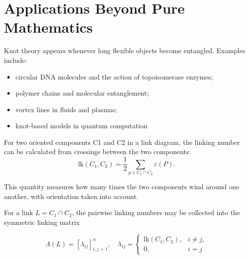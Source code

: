 \section{Applications Beyond Pure Mathematics}

Knot theory appears whenever long flexible objects become entangled. Examples include:

\begin{itemize}[label=$\bigoplus$]
    \item circular DNA molecules and the action of topoisomerase enzymes;
    \item polymer chains and molecular entanglement;
    \item vortex lines in fluids and plasmas;
    \item knot-based models in quantum computation
\end{itemize}

For two oriented components C1 and C2 in a link diagram, the linking number can be calculated from crossings between the two components:
\begin{equation}
    \text{lk}(C_1, C_2) = \frac{1}{2} \sum_{p\in C_1 \cap C_2} \varepsilon(P).
\end{equation}

This quantity measures how many times the two components wind around one another, with orientation taken
into account.

For a link $L= C_1 \cap C_2$, the pairwise linking numbers may be collected into the symmetric linking matrix

\begin{equation}
    \Lambda (L) = [\lambda_{ij}]_{i,j=1}^n , \quad \lambda_{ij} = \begin{cases}
      \text{lk}(C_1, C_2), & i\neq j, \\
      0, & i=j
    \end{cases}
\end{equation}
